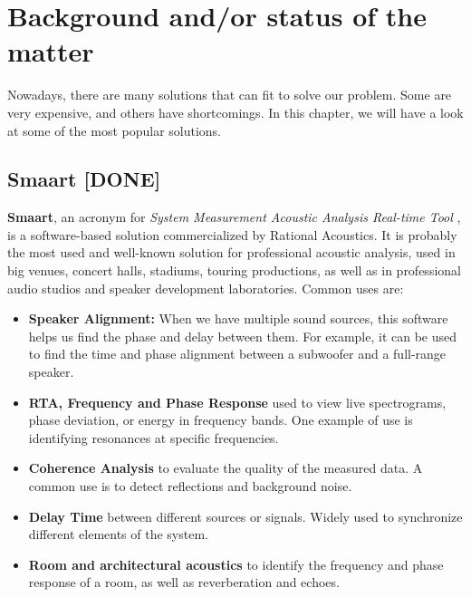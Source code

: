 \chapter{Background and/or status of the matter}

Nowadays, there are many solutions that can fit to solve our problem. Some are very expensive, and others have shortcomings. In this chapter, we will have a look at some of the most popular solutions.

\section{Smaart [DONE]}

\textbf{Smaart}, an acronym for \textit{System Measurement Acoustic Analysis Real-time Tool} \cite{SMAART}, is a software-based solution commercialized by Rational Acoustics. It is probably the most used and well-known solution for professional acoustic analysis, used in big venues, concert halls, stadiums, touring productions, as well as in professional audio studios and speaker development laboratories.  Common uses are:


\begin{itemize}
	\item \textbf{Speaker Alignment:} When we have multiple sound sources, this software helps us find the phase and delay between them. For example, it can be used to find the time and phase alignment between a subwoofer and a full-range speaker.
	
	\item \textbf{RTA, Frequency and Phase Response} used to view live spectrograms, phase deviation, or energy in frequency bands. One example of use is identifying resonances at specific frequencies.

	\item \textbf{Coherence Analysis} to evaluate the quality of the measured data. A common use is to detect reflections and background noise.
	
	\item \textbf{Delay Time} between different sources or signals. Widely used to synchronize different elements of the system.
	
	\item \textbf{Room and architectural acoustics} to identify the frequency and phase response of a room, as well as reverberation and echoes.
\end{itemize}
	

